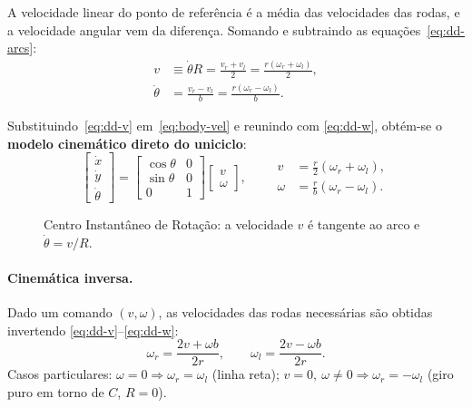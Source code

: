 \documentclass[11pt,a4paper]{article}
\begin{document}
A velocidade linear do ponto de referência é a média das velocidades das
rodas, e a velocidade angular vem da diferença. Somando e subtraindo as
equações~\eqref{eq:dd-arcs}:
\begin{align}
  v &\equiv \dot\theta R = \frac{v_r + v_l}{2}
     = \frac{r(\omega_r + \omega_l)}{2}, \label{eq:dd-v}\\
  \dot\theta &= \frac{v_r - v_l}{b}
     = \frac{r(\omega_r - \omega_l)}{b}. \label{eq:dd-w}
\end{align}

Substituindo~\eqref{eq:dd-v} em~\eqref{eq:body-vel} e reunindo com
\eqref{eq:dd-w}, obtém-se o \textbf{modelo cinemático direto do uniciclo}:
\begin{equation}
  \boxed{\;
  \begin{bmatrix}\dot{x}\\[2pt]\dot{y}\\[2pt]\dot{\theta}\end{bmatrix}
  =
  \begin{bmatrix}\cos\theta & 0\\[2pt]\sin\theta & 0\\[2pt]0 & 1\end{bmatrix}
  \begin{bmatrix} v \\ \omega \end{bmatrix},
  \qquad
  \begin{aligned}
    v &= \tfrac{r}{2}(\omega_r+\omega_l),\\
    \omega &= \tfrac{r}{b}(\omega_r-\omega_l).
  \end{aligned}
  \;}
  \label{eq:diffdrive}
\end{equation}

\begin{figure}[H]
  \centering
  \resizebox{0.5\textwidth}{!}{}
  \caption{Centro Instantâneo de Rotação: a velocidade $v$ é tangente ao arco
  e $\dot\theta = v/R$.}
  \label{fig:icr}
\end{figure}

\paragraph{Cinemática inversa.} Dado um comando $(v,\omega)$, as
velocidades das rodas necessárias são obtidas invertendo
\eqref{eq:dd-v}--\eqref{eq:dd-w}:
\begin{equation}
  \omega_r = \frac{2v + \omega b}{2r}, \qquad
  \omega_l = \frac{2v - \omega b}{2r}.
  \label{eq:dd-inv}
\end{equation}
Casos particulares: $\omega=0 \Rightarrow \omega_r=\omega_l$ (linha reta);
$v=0,\ \omega\neq 0 \Rightarrow \omega_r=-\omega_l$ (giro puro em torno de
$C$, $R=0$).
\end{document}
